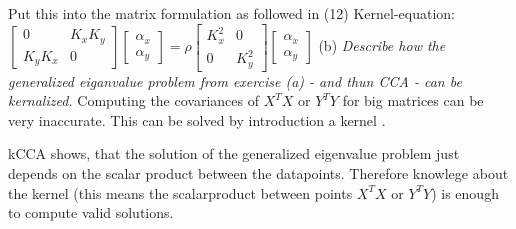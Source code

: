 \documentclass[a4paper, 12pt, titlepage]{article}
\begin{document}
Put this into the matrix formulation as followed in (12) \newline
Kernel-equation:
\newline
$
\begin{bmatrix} 0 & K_xK_y \\ K_yK_x & 0 \end{bmatrix}
\begin{bmatrix} \alpha_x \\ \alpha_y \end{bmatrix} =  \rho
\begin{bmatrix} K^2_x & 0 \\ 0 & K^2_y \end{bmatrix}
\begin{bmatrix} \alpha_x \\ \alpha_y \end{bmatrix}
$ \newline \newline
(b) \textit{ Describe how the generalized eiganvalue problem from exercise (a) - and thun CCA - can be kernalized. }
Computing the covariances of $X^TX$ or $Y^TY$ for big matrices can be very inaccurate. This can be solved by introduction a kernel .

kCCA shows, that the solution of the generalized eigenvalue problem just depends on the scalar product between the datapoints. Therefore knowlege  about the kernel (this means the scalarproduct between points $X^TX$ or $Y^TY$) is enough to compute valid solutions.
\end{document}
